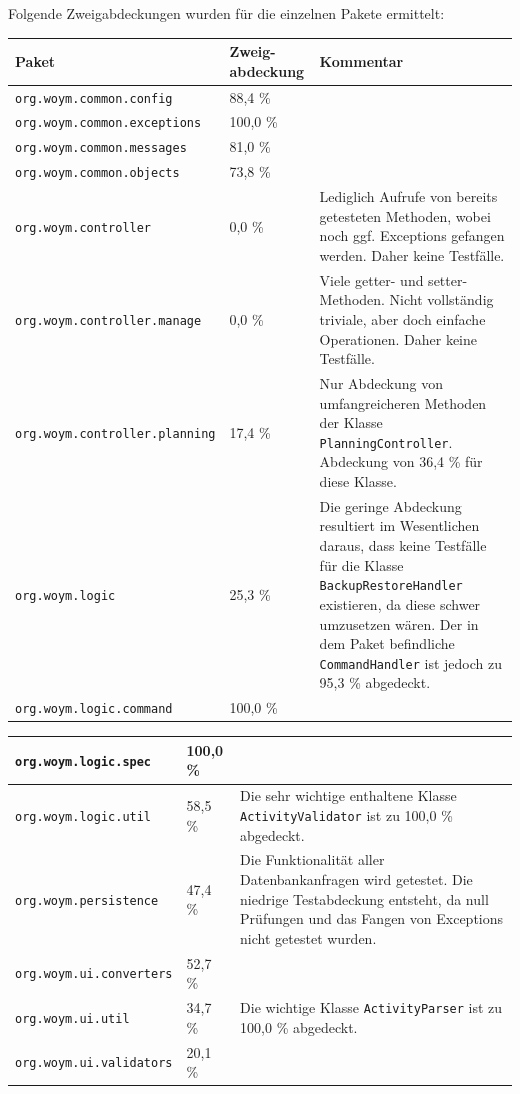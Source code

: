 \documentclass[fontsize=12pt,paper=a4,twoside]{scrartcl}
\renewcommand{\arraystretch}{1.2}
\begin{document}
Folgende Zweigabdeckungen wurden für die einzelnen Pakete ermittelt:

\renewcommand{\arraystretch}{1.3}
\begin{tabularx}{\textwidth}{|X|p{2cm}|X|}
\hline
\textbf{Paket} & \textbf{Zweig-abdeckung} & \textbf{Kommentar} \\\hline
\texttt{org.woym.common.config} & 88,4 \% & \\\hline
\texttt{org.woym.common.exceptions} & 100,0 \% & \\\hline
\texttt{org.woym.common.messages} & 81,0 \% & \\\hline
\texttt{org.woym.common.objects} & 73,8 \% &  \\\hline
\texttt{org.woym.controller} & 0,0 \% & Lediglich Aufrufe von bereits getesteten Methoden, wobei noch ggf. Exceptions gefangen werden. Daher keine Testfälle.\\\hline
\texttt{org.woym.controller.manage} & 0,0 \% & Viele getter- und setter-Methoden. Nicht vollständig triviale, aber doch einfache Operationen. Daher keine Testfälle. \\\hline
\texttt{org.woym.controller.planning} & 17,4 \% & Nur Abdeckung von umfangreicheren Methoden der Klasse \texttt{PlanningController}. Abdeckung von 36,4 \% für diese Klasse.\\\hline
\texttt{org.woym.logic} & 25,3 \% & Die geringe Abdeckung resultiert im Wesentlichen daraus, dass keine Testfälle für die Klasse \texttt{BackupRestoreHandler} existieren, da diese schwer umzusetzen wären. Der in dem Paket befindliche \texttt{CommandHandler} ist jedoch zu 95,3 \% abgedeckt.\\\hline
\texttt{org.woym.logic.command} & 100,0 \% & \\\hline
\end{tabularx}

\begin{tabularx}{\textwidth}{|X|p{2cm}|X|}
\hline
\texttt{org.woym.logic.spec} & 100,0 \% & \\\hline
\texttt{org.woym.logic.util} & 58,5 \% & Die sehr wichtige enthaltene Klasse \texttt{ActivityValidator} ist zu 100,0 \% abgedeckt.\\\hline
\texttt{org.woym.persistence} & 47,4 \% & Die Funktionalität aller Datenbankanfragen wird getestet. Die niedrige Testabdeckung entsteht, da null Prüfungen und das Fangen von Exceptions nicht getestet wurden. \\\hline
\texttt{org.woym.ui.converters} & 52,7 \% & \\\hline
\texttt{org.woym.ui.util} & 34,7 \% & Die wichtige Klasse \texttt{ActivityParser} ist zu 100,0 \% abgedeckt.\\\hline
\texttt{org.woym.ui.validators} & 20,1 \% & \\\hline
\end{tabularx}
\end{document}
